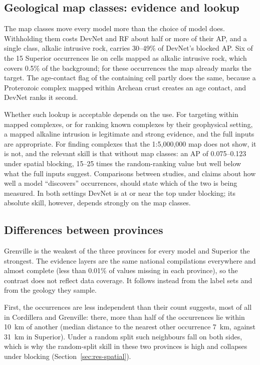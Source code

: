 \documentclass[pdflatex,sn-apa]{sn-jnl}
\begin{document}
\subsection{Geological map classes: evidence and lookup}\label{sec:disc-mapclasses}

The map classes move every model more than the choice of model does. Withholding them costs DevNet and RF about half or more of their AP, and a single class, alkalic intrusive rock, carries 30--49\% of DevNet's blocked AP. Six of the 15 Superior occurrences lie on cells mapped as alkalic intrusive rock, which covers 0.5\% of the background; for these occurrences the map already marks the target. The age-contact flag of the containing cell partly does the same, because a Proterozoic complex mapped within Archean crust creates an age contact, and DevNet ranks it second.

Whether such lookup is acceptable depends on the use. For targeting within mapped complexes, or for ranking known complexes by their geophysical setting, a mapped alkaline intrusion is legitimate and strong evidence, and the full inputs are appropriate. For finding complexes that the 1:5,000,000 map does not show, it is not, and the relevant skill is that without map classes: an AP of 0.075--0.123 under spatial blocking, 15--25 times the random-ranking value but well below what the full inputs suggest. Comparisons between studies, and claims about how well a model ``discovers'' occurrences, should state which of the two is being measured. In both settings DevNet is at or near the top under blocking; its absolute skill, however, depends strongly on the map classes.

\subsection{Differences between provinces}\label{sec:disc-provinces}

Grenville is the weakest of the three provinces for every model and Superior the strongest. The evidence layers are the same national compilations everywhere and almost complete (less than 0.01\% of values missing in each province), so the contrast does not reflect data coverage. It follows instead from the label sets and from the geology they sample.

First, the occurrences are less independent than their count suggests, most of all in Cordillera and Grenville: there, more than half of the occurrences lie within 10~km of another (median distance to the nearest other occurrence 7~km, against 31~km in Superior). Under a random split such neighbours fall on both sides, which is why the random-split skill in these two provinces is high and collapses under blocking (Section~\ref{sec:res-spatial}).
\end{document}
